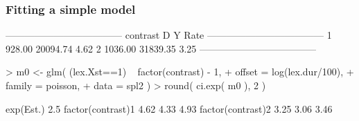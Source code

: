 \begin{frame}[fragile]
  \frametitle{Fitting a simple model}
\begin{Schunk}
\begin{Soutput}
 ------------------------------------ 
 contrast         D        Y    Rate  
 ------------------------------------ 
 1           928.00 20094.74    4.62  
 2          1036.00 31839.35    3.25  
 ------------------------------------ 
\end{Soutput}
\end{Schunk}
\begin{Schunk}
\begin{Sinput}
> m0 <- glm( (lex.Xst==1) ~ factor(contrast) - 1,
+            offset = log(lex.dur/100),
+            family = poisson, 
+              data = spl2 )
> round( ci.exp( m0 ), 2 )
\end{Sinput}
\begin{Soutput}
                  exp(Est.) 2.5%
factor(contrast)1      4.62 4.33  4.93
factor(contrast)2      3.25 3.06  3.46
\end{Soutput}
\end{Schunk}
\end{frame}

